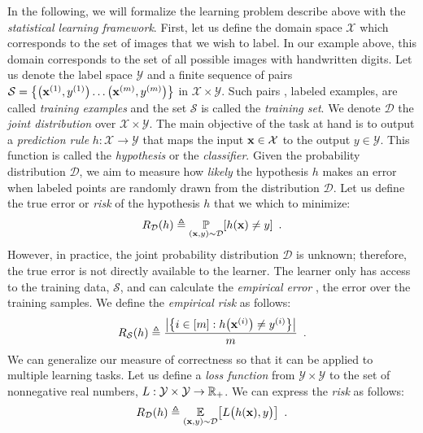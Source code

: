 In the following, we will formalize the learning problem describe above with the \emph{statistical learning framework}.
First, let us define the domain space $\mathcal{X}$ which corresponds to the set of images that we wish to label.
In our example above, this domain corresponds to the set of all possible images with handwritten digits.
Let us denote the label space $\mathcal{Y}$ and a finite sequence of pairs $\mathcal{S} = \left\{ \left(\xvec^{(1)}, y^{(1)} \right) \dots \left( \xvec^{(m)}, y^{(m)} \right) \right\}$ in $\mathcal{X} \times \mathcal{Y}$. 
Such pairs \ie, labeled examples, are called \emph{training examples} and the set $\mathcal{S}$ is called the \emph{training set}.
We denote $\mathcal{D}$ the \emph{joint distribution} over $\mathcal{X} \times \mathcal{Y}$.
The main objective of the task at hand is to output a \emph{prediction rule} $h: \mathcal{X} \rightarrow \mathcal{Y}$ that maps the input $\mathbf{x} \in \mathcal{X}$ to the output $y \in \mathcal{Y}$.
This function is called the \emph{hypothesis} or the \emph{classifier}. 
Given the probability distribution $\mathcal{D}$, we aim to measure how \emph{likely} the hypothesis $h$ makes an error when labeled points are randomly drawn from the distribution $\mathcal{D}$.
Let us define the true error or \emph{risk} of the hypothesis $h$ that we which to minimize:
\begin{equation}
  R_{\mathcal{D}}(h) \triangleq \Pbb_{(\xvec, y) \sim \mathcal{D}} \left[ h(\xvec) \neq  y \right] \enspace.
  \label{equation:ch2-risk1}
\end{equation}
However, in practice, the joint probability distribution $\mathcal{D}$ is unknown; therefore, the true error is not directly available to the learner.
The learner only has access to the training data, $\mathcal{S}$, and can calculate the \emph{empirical error} \ie, the error over the training samples.
We define the \emph{empirical risk} as follows:
\begin{equation}
  R_{\mathcal{S}}(h) \triangleq \frac{\left| \left\{i \in [m]: h\left(\xvec^{(i)}\right) \neq y^{(i)} \right\}\right|}{m} \enspace.
\end{equation}
We can generalize our measure of correctness so that it can be applied to multiple learning tasks.
Let us define a \emph{loss function} from $\mathcal{Y} \times \mathcal{Y}$ to the set of nonnegative real numbers, $L: \mathcal{Y} \times \mathcal{Y} \rightarrow \mathbb{R}_{+}$.
We can express the \emph{risk} as follows:
\begin{equation}
  R_{\mathcal{D}}(h) \triangleq \Ebb_{(\xvec, y) \sim \mathcal{D}} \left[ L\big( h(\xvec), y \big) \right] \enspace.
  \label{equation:ch2-risk2}
\end{equation}
